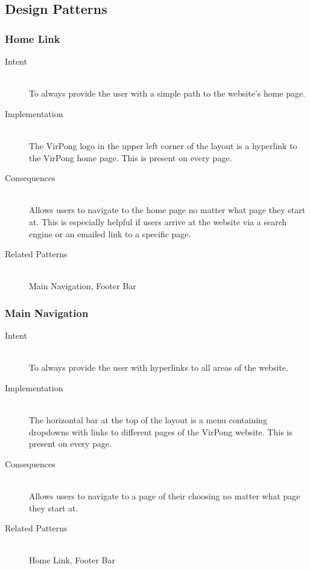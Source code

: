 %

	\subsection{Design Patterns}
	
		\subsubsection{Home Link}
			\begin{description}
				\item[Intent] \hfill \\
					To always provide the user with a simple path to the website's home page.
				\item[Implementation] \hfill \\
					The VirPong logo in the upper left corner of the layout is a hyperlink to the VirPong home page. This is present on every page.
				\item[Consequences] \hfill \\
					Allows users to navigate to the home page no matter what page they start at. This is especially helpful if users arrive at the website via a search engine or an emailed link to a specific page.
				\item[Related Patterns] \hfill \\
					Main Navigation, Footer Bar
			\end{description}
			
		\subsubsection{Main Navigation}
			\begin{description}
				\item[Intent] \hfill \\
					To always provide the user with hyperlinks to all areas of the website.
				\item[Implementation] \hfill \\
					The horizontal bar at the top of the layout is a menu containing dropdowns with links to different pages of the VirPong website. This is present on every page.
				\item[Consequences] \hfill \\
					Allows users to navigate to a page of their choosing no matter what page they start at.
				\item[Related Patterns] \hfill \\
					Home Link, Footer Bar
			\end{description}
			
